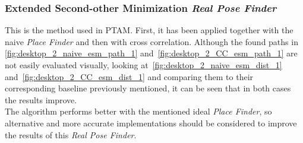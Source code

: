 \subsubsection{Extended Second-other Minimization \textit{Real Pose Finder}}
\label{ssub:extended_second_orther_minimization_textit_real_pose_finder}

This is the method used in PTAM. First, it has been applied together with the naive \textit{Place Finder} and then with cross correlation. Although the found paths in \ref{fig:desktop_2_naive_esm_path_1} and~\ref{fig:desktop_2_CC_esm_path_1} are not easily evaluated visually, looking at~\ref{fig:desktop_2_naive_esm_dist_1} and~\ref{fig:desktop_2_CC_esm_dist_1} and comparing them to their corresponding baseline previously mentioned, it can be seen that in both cases the results improve.\\

The algorithm performs better with the mentioned ideal \textit{Place Finder}, so alternative and more accurate implementations should be considered to improve the results of this \textit{Real Pose Finder}.\\


